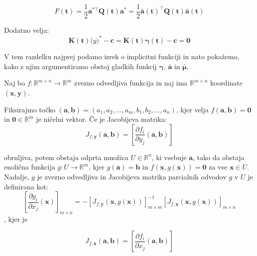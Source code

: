 \documentclass[mat2, tisk]{fmfdelo}
\newcommand{\aimplicit}{\bar{\mathbf{a}}}
\newcommand{\muimplicit}{\bar{\mathbf{\mu}}}
\newcommand{\yimplicit}{\mathbf{\gamma}}
\newcommand{\qmat}{\mathbf{Q}}
\newcommand{\kmat}{\mathbf{K}}
\newcommand{\avec}{\mathbf{a}}
\newcommand{\tvec}{\mathbf{t}}
\begin{document}
\begin{equation}
    F(\mathbf{t}) = \frac{1}{2}\avec^{*\top}\qmat(\tvec)\avec^* = \frac{1}{2} \aimplicit(\tvec)^\top \qmat(\tvec) \aimplicit(\tvec)
\end{equation}

Dodatno velja:
\begin{equation}
    \label{eq:equilibrium_implicit}
    \kmat(\tvec) \mathbf(y)^* - \mathbf{c} = \kmat(\tvec) \yimplicit(\tvec) - \mathbf{c} = \mathbf{0}
\end{equation}

V tem razdelku najprej podamo izrek o implicitni funkciji \cite{lee2003smooth} in nato pokažemo, kako z njim argumentiramo obstoj gladkih funkcij $\yimplicit$, $\aimplicit$ in $\muimplicit$.

\begin{izrek}
    Naj bo $f: \mathbb{R}^{m+n} \to \mathbb{R}^m$ zvezno odvedljiva funkcija in naj ima $\mathbb{R}^{m+n}$ koordinate $(\mathbf{x},\mathbf{y})$. 
    
    Fiksirajmo točko $(\mathbf{a}, \mathbf{b}) = (a_1, a_2, \ldots, a_m, b_1, b_2, \ldots, a_n)$, kjer velja $f(\mathbf{a},\mathbf{b}) = \mathbf{0}$ in $\mathbf{0} \in \mathbb{R}^m$ je ničelni vektor. Če je Jacobijeva matrika:
    \begin{equation}
        J_{f,\mathbf{y}}(\mathbf{a}, \mathbf{b}) = \left[ \frac{\partial f_i}{\partial y_j} (\mathbf{a},\mathbf{b})\right]
    \end{equation}

    obrnljiva, potem obstaja odprta množica $U \in \mathbb{R}^n$, ki vsebuje $\mathbf{a}$, tako da obstaja enolična funkcija $g:U \to \mathbb{R}^m$, kjer $g(\mathbf{a}) = \mathbf{b}$ in $f(\mathbf{x}, g(\mathbf{x})) = \mathbf{0}$ za vse $\mathbf{x} \in U$. Nadalje, $g$ je zvezno odvedljiva in Jacobijeva matrika parcialnih odvodov $g$ v $U$ je definirana kot:
    \begin{equation}
        \left[\frac{\partial g_i}{\partial x_j}(\mathbf{x})\right]_{m \times n}
= -\left[ J_{f, \mathbf{y}}(\mathbf{x}, g(\mathbf{x})) \right]^{-1}_{m \times m}
\left[ J_{f,\mathbf{x}}(\mathbf{x}, g(\mathbf{x})) \right]_{m \times n}
    \end{equation}, kjer je 

\begin{equation}
        J_{f,\mathbf{x}}(\mathbf{a}, \mathbf{b}) = \left[ \frac{\partial f_i}{\partial x_j} (\mathbf{a},\mathbf{b})\right]
    \end{equation}
\end{izrek}
\end{document}
